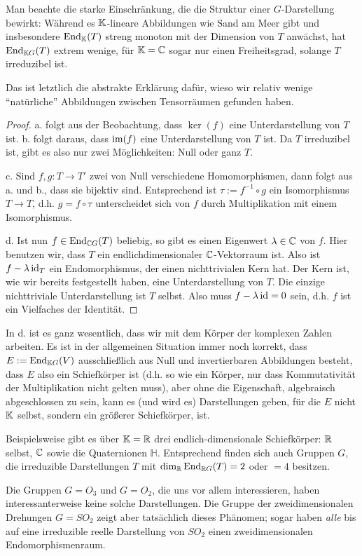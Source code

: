 \begin{remark}
Man beachte die starke Einschränkung, die die Struktur einer $G$-Darstellung bewirkt: Während es $\mathbb{K}$-lineare Abbildungen wie Sand am Meer gibt und insbesondere $\operatorname{End}_{\mathbb{K}}(T)$ streng monoton mit der Dimension von $T$ anwächst, hat $\operatorname{End}_{\mathbb{K} G}(T)$ extrem wenige, für $\mathbb{K}=\mathbb{C}$ sogar nur einen Freiheitsgrad, solange $T$ irreduzibel ist.

Das ist letztlich die abstrakte Erklärung dafür, wieso wir relativ wenige \enquote{natürliche} Abbildungen zwischen Tensorräumen gefunden haben.
\end{remark}

\begin{proof}
a. folgt aus der Beobachtung, dass $\ker(f)$ eine Unterdarstellung von $T$ ist. b. folgt daraus, dass $\operatorname{im}(f)$ eine Unterdarstellung von $T$ ist. Da $T$ irreduzibel ist, gibt es also nur zwei Möglichkeiten: Null oder ganz $T$.

\smallbreak
c. Sind $f, g: T\to T'$ zwei von Null verschiedene Homomorphismen, dann folgt aus a. und b., dass sie bijektiv sind. Entsprechend ist $\tau:=f^{-1}\circ g$ ein Isomorphismus $T\to T$, d.h. $g=f\circ\tau$ unterscheidet sich von $f$ durch Multiplikation mit einem Isomorphismus.

\smallbreak
d. Ist nun $f\in\operatorname{End}_{\mathbb{C} G}(T)$ beliebig, so gibt es einen Eigenwert $\lambda\in\mathbb{C}$ von $f$. Hier benutzen wir, dass $T$ ein endlichdimensionaler $\mathbb{C}$-Vektorraum ist. Also ist $f-\lambda\operatorname{id}_T$ ein Endomorphismus, der einen nichttrivialen Kern hat. Der Kern ist, wie wir bereits festgestellt haben, eine Unterdarstellung von $T$. Die einzige nichttriviale Unterdarstellung ist $T$ selbst. Also muss $f-\lambda\operatorname{id} = 0$ sein, d.h. $f$ ist ein Vielfaches der Identität.
\end{proof}

\begin{remark}
In d. ist es ganz wesentlich, dass wir mit dem Körper der komplexen Zahlen arbeiten. Es ist in der allgemeinen Situation immer noch korrekt, dass $E:=\operatorname{End}_{\mathbb{K} G}(V)$ ausschließlich aus Null und invertierbaren Abbildungen besteht, dass $E$ also ein Schiefkörper ist (d.h. so wie ein Körper, nur dass Kommutativität der Multiplikation nicht gelten muss), aber ohne die Eigenschaft, algebraisch abgeschlossen zu sein, kann es (und wird es) Darstellungen geben, für die $E$ nicht $\mathbb{K}$ selbst, sondern ein größerer Schiefkörper, ist.

\medbreak
Beispielsweise gibt es über $\mathbb{K}=\mathbb{R}$ drei endlich-dimensionale Schiefkörper: $\mathbb{R}$ selbst, $\mathbb{C}$ sowie die Quaternionen $\mathbb{H}$. Entsprechend finden sich auch Gruppen $G$, die irreduzible Darstellungen $T$ mit $\dim_{\mathbb{R}} \operatorname{End}_{\mathbb{R} G}(T)=2$ oder $=4$ besitzen.

Die Gruppen $G=O_3$ und $G=O_2$, die uns vor allem interessieren, haben interessanterweise keine solche Darstellungen. Die Gruppe der zweidimensionalen Drehungen $G=SO_2$ zeigt aber tatsächlich dieses Phänomen; sogar haben \emph{alle} bis auf eine irreduzible reelle Darstellung von $SO_2$ einen zweidimensionalen Endomorphismenraum.
\end{remark}

